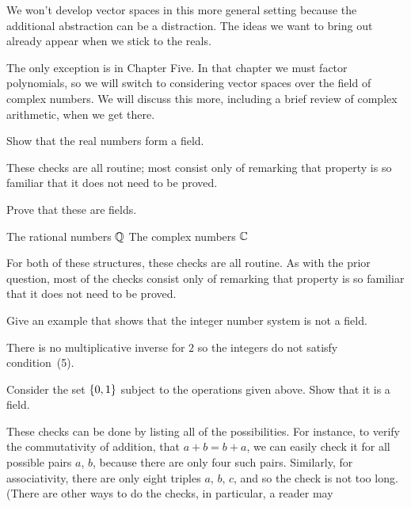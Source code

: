 We won't develop vector spaces in this more general setting because
the additional abstraction can be a distraction.
The ideas we want to bring out already appear when we stick to the reals.

The only exception is in Chapter Five.
In that chapter we must factor polynomials,
so we will switch to considering vector spaces over the
field of complex numbers.
We will discuss this more, including a brief review of complex arithmetic,
when we get there.

\begin{exercises}
  \item 
    Show that the real numbers form a field.
    \begin{answer}
      These checks are all routine; most consist only of remarking that 
      property is so familiar that it does not need to be proved.
    \end{answer}
  \item 
    Prove that these are fields.
    \begin{exparts*}
       \partsitem The rational numbers $\mathbb{Q}$
       \partsitem The complex numbers  $\mathbb{C}$
    \end{exparts*}
    \begin{answer}
      For both of these structures, these checks are all routine.
      As with the prior question, most of the checks consist only of remarking
      that property is so familiar that it does not need to be proved.
    \end{answer}
  \item 
     Give an example that shows that the integer number system
     is not a field.
     \begin{answer}
       There is no multiplicative inverse for $2$ so the integers do not
       satisfy condition~(5).
     \end{answer}
  \item \label{exer:BinField} 
     Consider the set $\mbox{$\{0,1\}$}$ subject to the operations given above.
     Show that it is a field.
     \begin{answer}
       These checks can be done by listing all of the possibilities.
       For instance, to verify the commutativity of addition, that $a+b=b+a$,
       we can easily check it for all possible pairs $a$, $b$, because there
       are only four such pairs.  
       Similarly, for associativity, there are only eight triples $a$, $b$,
       $c$, and so the check is not too long.
       (There are other ways to do the checks, in particular, a reader may 

\end{answer}
\end{exercises}
